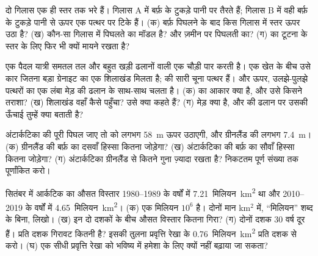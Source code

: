 \begin{exercise}[$\star\star$]\label{exo:g8:ice-on-earth:8}
दो गिलास एक ही स्तर तक भरे हैं। गिलास A में बर्फ़ के टुकड़े पानी पर तैरते हैं; गिलास B
में वही बर्फ़ के टुकड़े पानी से ऊपर एक पत्थर पर टिके हैं। (क) बर्फ़ पिघलने के बाद किस
गिलास में स्तर ऊपर उठा है? (ख) कौन-सा गिलास  में पिघलते  का मॉडल है? और
ज़मीन पर पिघलती  का? (ग)  का टूटना  के स्तर के लिए फिर भी
क्यों मायने रखता
है?
\end{exercise}

\begin{exercise}[$\star\star$]\label{exo:g8:ice-on-earth:9}
एक पैदल यात्री समतल तल और बहुत खड़ी ढलानों वाली एक चौड़ी  पार करती है। एक खेत के
बीच उसे कार जितना बड़ा ग्रेनाइट का एक शिलाखंड मिलता है;  की सारी  चूना
पत्थर हैं। और ऊपर, उलझे-पुलझे पत्थरों का एक लंबा मेड़  की ढलान के साथ-साथ चलता है।
(क)  का आकार क्या है, और उसे किसने तराशा? (ख) शिलाखंड वहाँ कैसे पहुँचा? उसे क्या
कहते हैं? (ग) मेड़ क्या है, और  की ढलान पर उसकी ऊँचाई तुम्हें क्या बताती
है?
\end{exercise}

\begin{exercise}[$\star\star$]\label{exo:g8:ice-on-earth:10}
अंटार्कटिका की  पूरी पिघल जाए तो  को लगभग \qty{58}{m} ऊपर उठाएगी, और
ग्रीनलैंड की  लगभग \qty{7.4}{m}। (क) ग्रीनलैंड की बर्फ़ का दसवाँ हिस्सा कितना
जोड़ेगा? (ख) अंटार्कटिका की बर्फ़ का सौवाँ हिस्सा कितना जोड़ेगा? (ग) अंटार्कटिका
ग्रीनलैंड से कितने गुना ज़्यादा रखता है? निकटतम पूर्ण संख्या तक पूर्णांकित
करो।
\end{exercise}

\begin{exercise}[$\star\star\star$]\label{exo:g8:ice-on-earth:11}
सितंबर में आर्कटिक  का औसत विस्तार 1980--1989 के वर्षों में
\num{7.21}~मिलियन~\unit{km^2} था और 2010--2019 के वर्षों में
\num{4.65}~मिलियन~\unit{km^2}। (क) एक मिलियन $10^6$ है। दोनों मान km$^2$ में,
``मिलियन'' शब्द के बिना, लिखो। (ख) इन दो दशकों के बीच औसत विस्तार कितना गिरा?
(ग) दोनों दशक 30 वर्ष दूर हैं। प्रति दशक गिरावट कितनी है? इसकी तुलना प्रवृत्ति रेखा के
\num{0.76}~मिलियन~\unit{km^2} प्रति दशक से करो। (घ) एक सीधी प्रवृत्ति रेखा को भविष्य
में हमेशा के लिए क्यों नहीं बढ़ाया जा
सकता?
\end{exercise}

